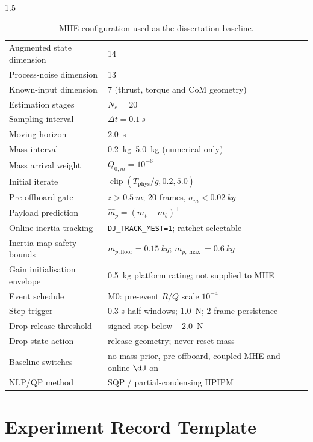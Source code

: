 \begin{appendices}
\begin{spacing}{1.5}
\begin{table}[ht]
\centering
\caption{MHE configuration used as the dissertation baseline.}
\small
\begin{tabularx}{\textwidth}{@{}p{} X@{}}
\toprule
Augmented state dimension & 14 \\
Process-noise dimension & 13 \\
Known-input dimension & 7 (thrust, torque and CoM geometry) \\
Estimation stages & $N_e=20$ \\
Sampling interval & $\Delta t=\SI{0.1}{s}$ \\
Moving horizon & \SI{2.0}{s} \\
Mass interval & \SIrange{0.2}{5.0}{kg} (numerical only) \\
Mass arrival weight & $Q_{0,m}=10^{-6}$ \\
Initial iterate & $\operatorname{clip}(T_{\mathrm{phys}}/g,0.2,5.0)$ \\
Pre-offboard gate & $z>\SI{0.5}{m}$; 20 frames, $\sigma_m<\SI{0.02}{kg}$ \\
Payload prediction & $\hat m_p=(\hat m_t-m_b)^+$ \\
Online inertia tracking & \texttt{DJ\_TRACK\_MEST=1}; ratchet selectable \\
Inertia-map safety bounds & $m_{p,\mathrm{floor}}=\SI{0.15}{kg}$; $m_{p,\max}=\SI{0.6}{kg}$ \\
Gain initialisation envelope & \SI{0.5}{kg} platform rating; not supplied to MHE \\
Event schedule & M0: pre-event $R/Q$ scale $10^{-4}$ \\
Step trigger & 0.3-s half-windows; \SI{1.0}{N}; 2-frame persistence \\
Drop release threshold & signed step below \SI{-2.0}{N} \\
Drop state action & release geometry; never reset mass \\
Baseline switches & no-mass-prior, pre-offboard, coupled MHE and online $\dJ$ on \\
NLP/QP method & SQP / partial-condensing HPIPM \\
\bottomrule
\end{tabularx}
\end{table}
\end{spacing}

\clearpage
\chapter{Experiment Record Template}


\end{appendices}
